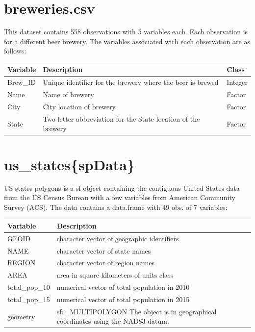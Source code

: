 \documentclass{report}
\begin{document}
\section{breweries.csv}
\label{sec:breweries}
This dataset contains 558 observations with 5 variables each. Each observation is for a different beer brewery. The variables associated with each observation are as follows:\\
\begin{center}
\begin{tabular}{l l l}
Variable & Description & Class\\
\hline
\hline
Brew_ID & Unique identifier for the brewery where the beer is brewed & Integer\\
\hline
Name & Name of brewery & Factor\\
\hline
City & City location of brewery & Factor\\
\hline
State & Two letter abbreviation for the State location of the brewery & Factor\\
\hline
\end{tabular}
\end{center}

\section{us_states\{spData\}}
\label{sec:usstates}
US states polygons is a sf object containing the contiguous United States data from the US Census Bureau with a few variables from American Community Survey (ACS). The data contains a data.frame with 49 obs. of 7 variables:\\
\begin{tabular}{l l }
Variable & Description\\
\hline
\hline
GEOID & character vector of geographic identifiers\\
\hline
NAME & character vector of state names\\
\hline
REGION & character vector of region names\\
\hline
AREA & area in square kilometers of units class\\
\hline
total_pop_10 & numerical vector of total population in 2010\\
\hline
total_pop_15 & numerical vector of total population in 2015\\
\hline
geometry & sfc_MULTIPOLYGON The object is in geographical coordinates using the NAD83 datum.\\
\hline
\end{tabular}\\
\end{document}
